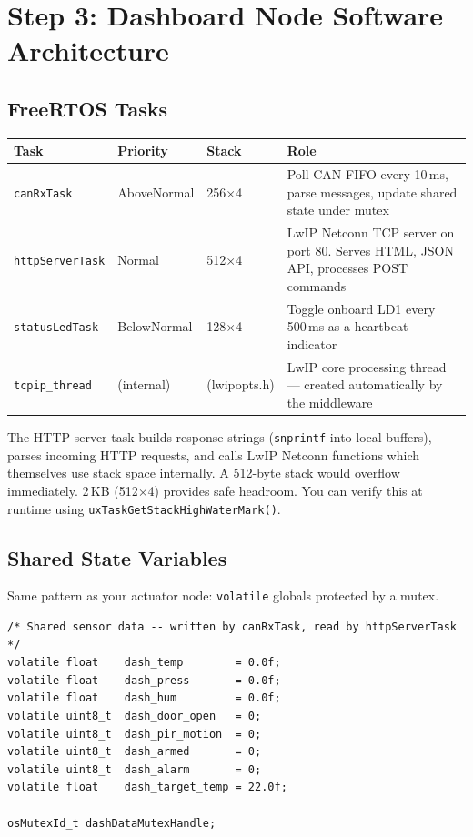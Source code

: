 \documentclass[11pt,a4paper]{article}
\begin{document}
\section{Step 3: Dashboard Node Software Architecture}

\subsection{FreeRTOS Tasks}

\begin{table}[h]
\centering
\begin{tabular}{@{}lllp{7.5cm}@{}}
\toprule
\textbf{Task} & \textbf{Priority} & \textbf{Stack} & \textbf{Role} \\
\midrule
\texttt{canRxTask} & AboveNormal & 256$\times$4 & Poll CAN FIFO every 10\,ms, parse messages, update shared state under mutex \\
\texttt{httpServerTask} & Normal & 512$\times$4 & LwIP Netconn TCP server on port 80. Serves HTML, JSON API, processes POST commands \\
\texttt{statusLedTask} & BelowNormal & 128$\times$4 & Toggle onboard LD1 every 500\,ms as a heartbeat indicator \\
\texttt{tcpip\_thread} & (internal) & (lwipopts.h) & LwIP core processing thread --- created automatically by the middleware \\
\bottomrule
\end{tabular}
\end{table}

\begin{infobox}
The HTTP server task builds response strings (\texttt{snprintf} into local buffers), parses incoming HTTP requests, and calls LwIP Netconn functions which themselves use stack space internally. A 512-byte stack would overflow immediately. 2\,KB (512$\times$4) provides safe headroom. You can verify this at runtime using \texttt{uxTaskGetStackHighWaterMark()}.
\end{infobox}

\subsection{Shared State Variables}
Same pattern as your actuator node: \texttt{volatile} globals protected by a mutex.

\begin{lstlisting}
/* Shared sensor data -- written by canRxTask, read by httpServerTask */
volatile float    dash_temp        = 0.0f;
volatile float    dash_press       = 0.0f;
volatile float    dash_hum         = 0.0f;
volatile uint8_t  dash_door_open   = 0;
volatile uint8_t  dash_pir_motion  = 0;
volatile uint8_t  dash_armed       = 0;
volatile uint8_t  dash_alarm       = 0;
volatile float    dash_target_temp = 22.0f;

osMutexId_t dashDataMutexHandle;
\end{lstlisting}
\end{document}
